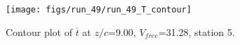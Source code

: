 \begin{figure}[H]
\centering
\texttt{[image: figs/run\_49/run\_49\_T\_contour]}
\caption{Contour plot of $\overline{t}$ at $z/c$=9.00, $V_{free}$=31.28, station 5.}
\label{fig:run_49_T_contour}
\end{figure}


